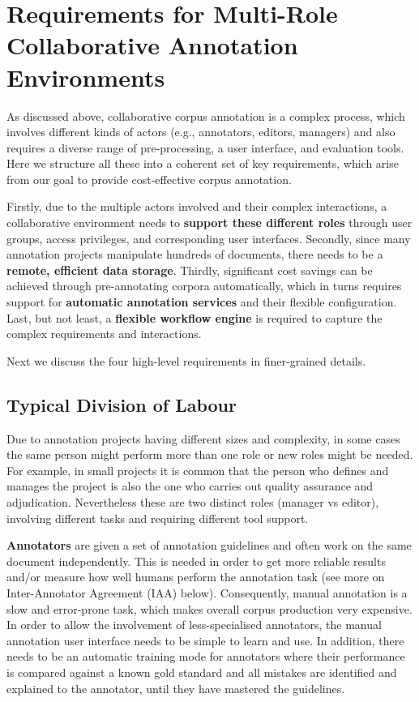 \section{Requirements for Multi-Role Collaborative Annotation Environments}\label{sect:requirements}

As discussed above, collaborative corpus annotation is a complex process, which involves different kinds of actors (e.g., annotators, editors, managers) and also requires a diverse range of pre-processing, a user interface, and evaluation tools. Here we structure all these into a coherent set of key requirements, which arise from our goal to provide cost-effective corpus annotation. 

Firstly, due to the multiple actors involved and their complex interactions, a collaborative environment needs to {\bf support these different roles} through user groups, access privileges, and corresponding user interfaces. Secondly, since many annotation projects manipulate hundreds of documents, there needs to be a {\bf remote, efficient data storage}. Thirdly, significant cost savings can be achieved through pre-annotating corpora automatically, which in turns requires support for {\bf automatic annotation services} and their flexible configuration. Last, but not least, a {\bf flexible workflow engine} is required to capture the complex requirements and interactions. 

Next we discuss the four high-level requirements in finer-grained details.      

\subsection{Typical Division of Labour}\label{sect:multi-role-support}

Due to annotation projects having different sizes and complexity, in some cases the same person might perform more than one role or new roles might be needed. For example, in small projects it is common that the person who defines and manages the project is also the one who carries out quality assurance and adjudication. Nevertheless these are two distinct roles (manager vs editor), involving different tasks and requiring different tool support.   

{\bf Annotators} are given a set of annotation guidelines and often work on the same document independently. This is needed in order to get more reliable results and/or measure how well humans perform the annotation task (see more on Inter-Annotator Agreement (IAA) below). Consequently, manual annotation is a slow and error-prone task, which makes overall corpus production very expensive. In order to allow the involvement of less-specialised annotators, the manual annotation user interface needs to be simple to learn and use.  In addition, there needs to be an automatic training mode for annotators where their performance is compared against a known gold standard and all mistakes are identified and explained to the annotator, until they have mastered the guidelines. 

